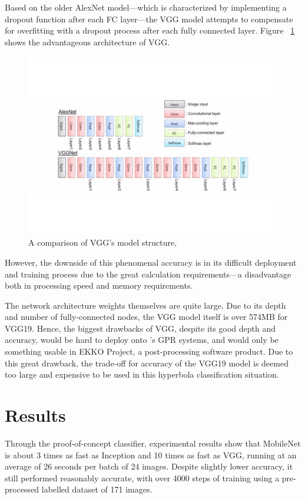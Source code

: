 \documentclass[se,blockletter]{uw-wkrpt}
\begin{document}
Based on the older AlexNet model---which is characterized by implementing a dropout function after each FC layer---the VGG model attempts to compensate for overfitting with a dropout process after each fully connected layer. Figure ~\ref{fig:VGG-vs-AlexNet}
shows the advantageous architecture of VGG.

\begin{figure}
  \centering
  \includegraphics[height=8cm]{VGG-vs-AlexNet}
  \caption{A comparison of VGG's model structure, ~\cite{ref:}}
  \label{fig:VGG-vs-AlexNet}
\end{figure}

However, the downside of this phenomenal accuracy is in its difficult deployment and training process due to the great calculation requirements---a disadvantage both in processing speed and memory requirements. 

The network architecture weights themselves are quite large. Due to its depth and number of fully-connected nodes, the VGG model itself is over 574MB for VGG19. Hence, the biggest drawbacks of VGG, despite its good depth and accuracy, would be hard to deploy onto \thecompany{}'s GPR systems, and would only be something usable in EKKO Project, a post-processing software product. Due to this great drawback, the trade-off for accuracy of the VGG19 model is deemed too large and expensive to be used in this hyperbola classification situation.


\section{Results}

Through the proof-of-concept classifier, experimental results show that MobileNet is about 3 times as fast as Inception and 10 times as fast as VGG, running at an average of 26 seconds per batch of 24 images. Despite slightly lower accuracy, it still performed reasonably accurate, with over 4000 steps of training using a pre-processed labelled dataset of 171 images. 
\end{document}

